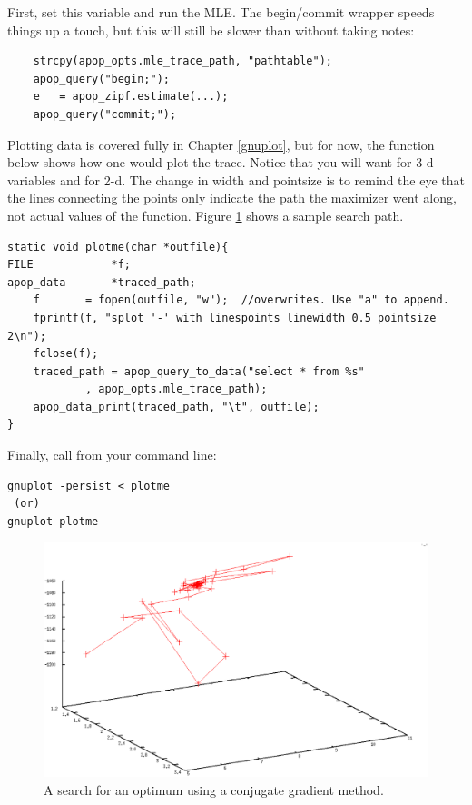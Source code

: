First, set this variable and run the MLE. The begin/commit wrapper
speeds things up a touch, but this will still be slower than without
taking notes:
\begin{lstlisting}
    strcpy(apop_opts.mle_trace_path, "pathtable");
    apop_query("begin;");
    e   = apop_zipf.estimate(...);
    apop_query("commit;");
\end{lstlisting}
Plotting data is covered fully in Chapter \ref{gnuplot}, but for now,
the function below shows how one would plot the trace.  Notice that
you will want  for 3-d variables and  for
2-d. The change in width and pointsize is to remind the eye that the
lines connecting the points only indicate the path the maximizer went
along, not actual values of the function. Figure \ref{searchfig} shows a
sample search path.

\begin{lstlisting}
static void plotme(char *outfile){
FILE            *f;
apop_data       *traced_path;
    f       = fopen(outfile, "w");  //overwrites. Use "a" to append.
    fprintf(f, "splot '-' with linespoints linewidth 0.5 pointsize 2\n");
    fclose(f);
    traced_path = apop_query_to_data("select * from %s"
            , apop_opts.mle_trace_path);
    apop_data_print(traced_path, "\t", outfile);
}
\end{lstlisting}

Finally, call  from your command line:
\begin{lstlisting}
gnuplot -persist < plotme
 (or)
gnuplot plotme -
\end{lstlisting}

\begin{figure}
\includegraphics[width=\textwidth*\real{1.1}]{search}
\caption{A search for an optimum using a conjugate gradient method.}
\label{searchfig}
\end{figure}


